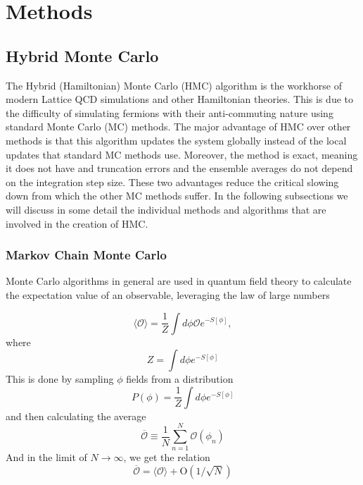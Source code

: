 
\chapter{Methods}
\label{sec:methods}


\section{Hybrid Monte Carlo}
The Hybrid (Hamiltonian) Monte Carlo (HMC) algorithm is the workhorse of modern Lattice QCD simulations and other Hamiltonian theories. This is due to the difficulty of simulating fermions with their anti-commuting nature using standard Monte Carlo (MC) methods. The major advantage of HMC over other methods is that this algorithm updates the system globally instead of the local updates that standard MC methods use. Moreover, the method is exact, meaning it does not have and truncation errors and the ensemble averages do not depend on the integration step size. These two advantages reduce the critical slowing down from which the other MC methods suffer. In the following subsections we will discuss in some detail the individual methods and algorithms that are involved in the creation of HMC.

\subsection{Markov Chain Monte Carlo}

Monte Carlo algorithms in general are used in quantum field theory to calculate the expectation value of an observable, leveraging the law of large numbers

\begin{equation}
    \langle\mathcal{O}\rangle = \frac{1}{Z} \int d\phi \mathcal{O} e^{-S[\phi]},
\end{equation}
where
\begin{equation}
    Z = \int d\phi e^{-S[\phi]}
\end{equation}
This is done by sampling $\phi$ fields from a distribution
\begin{equation}
    P(\phi) = \frac{1}{Z} \int d\phi e^{-S[\phi]}
\end{equation}
and then calculating the average
\begin{equation}
    \overline{\mathcal{O}} \equiv \frac{1}{N}\sum^{N}_{n=1} \mathcal{O}(\phi_n)
    \label{eq:ensamble_average}
\end{equation}
And in the limit of $N \to \infty$, we get the relation
\begin{equation}
    \overline{\mathcal{O}} = \langle\mathcal{O}\rangle + \mathrm{O}(1/\sqrt{N})
\end{equation}

